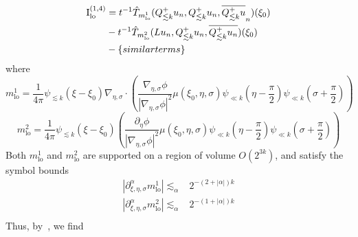 \documentclass[letterpaper, reqno,final]{amsart}
\newcommand{\fhPi}{\frac{\pi}{2}}
\newcommand{\rmI}{\mathrm{I}}
\newcommand{\deles}{\nabla_{\eta,\sigma}}
\newcommand{\bigO}[1]{O\left({#1}\right)}
\newcommand{\btext}[1]{\left\{\textup{#1}\right\}}
\newcommand{\bsim}{\btext{similar terms}}
\begin{document}
\begin{equation*}\begin{split}
    \rmI^{(1,4)}_{\text{lo}} %
    &= t^{-1} \hat{T}_{m^1_\text{lo}}(Q^+_{\lesssim k} u_n,Q^+_{\lesssim k} u_n, \overline{Q^+_{\lesssim k}u}_n)(\xi_0)\\
    &- t^{-1} \hat{T}_{m^2_\text{lo}}(L u_n,Q^+_{\lesssim k} u_n, \overline{Q^+_{\lesssim k}u_n})(\xi_0)\\
    &-\bsim
\end{split}\end{equation*}
where 
\begin{equation*}
    m^1_{\text{lo}} = \frac{1}{4\pi}\psi_{\lesssim k}(\xi - \xi_0)\deles \cdot \left(\frac{\deles \phi}{|\deles \phi|^2}\mu(\xi_0,\eta,\sigma) \psi_{\ll k}(\eta - \fhPi) \psi_{\ll k}(\sigma + \fhPi) \right)
\end{equation*}
\begin{equation*}
    m^2_{\text{lo}} = \frac{1}{4\pi}\psi_{\lesssim k}(\xi - \xi_0)\left(\frac{\partial_\eta \phi}{|\deles \phi|^2}\mu(\xi_0,\eta,\sigma) \psi_{\ll k}(\eta - \fhPi) \psi_{\ll k}(\sigma + \fhPi) \right)
\end{equation*}
Both $m^1_\text{lo}$ and $m^2_{\text{lo}}$ are supported on a region of volume $\bigO{2^{3k}}$, and satisfy the symbol bounds
\begin{equation*}\begin{split}
    |\partial_{\xi,\eta,\sigma}^{\alpha} m^1_{\text{lo}}| \lesssim_\alpha& 2^{-(2 + |\alpha|)k}\\
    |\partial_{\xi,\eta,\sigma}^{\alpha} m^2_{\text{lo}}| \lesssim_\alpha& 2^{-(1 + |\alpha|)k}\\
\end{split}\end{equation*}
Thus, by~, we find
\end{document}
